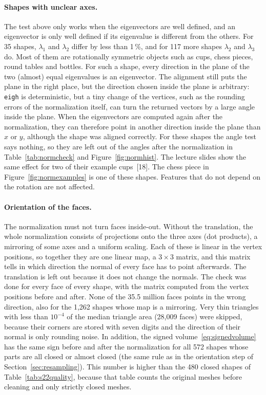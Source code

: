 \documentclass[10pt,a4paper]{article}
\begin{document}
\paragraph{Shapes with unclear axes.}
The test above only works when the eigenvectors are well defined, and an eigenvector is only well defined if its eigenvalue is
different from the others. For 35 shapes, $\lambda_1$ and $\lambda_2$ differ by less than 1\,\%, and for 117 more shapes
$\lambda_2$ and $\lambda_3$ do. Most of them are rotationally symmetric objects such as cups, chess pieces, round tables and
bottles. For such a shape, every direction in the plane of the two (almost) equal eigenvalues is an eigenvector. The
alignment still puts the plane in the right place, but the direction chosen inside the plane is arbitrary: \texttt{eigh} is
deterministic, but a tiny change of the vertices, such as the rounding errors of the normalization itself, can turn the
returned vectors by a large angle inside the plane. When the eigenvectors are computed again after the normalization, they can
therefore point in another direction inside the plane than $x$ or $y$, although the shape was aligned correctly. For these
shapes the angle test says nothing, so they are left out of the angles after the normalization in Table~\ref{tab:normcheck}
and Figure~\ref{fig:normhist}. The lecture slides show the same effect for two of their example cups~[18]. The chess piece in
Figure~\ref{fig:normexamples} is one of these shapes. Features that do not depend on the rotation are not affected.

\paragraph{Orientation of the faces.}
The normalization must not turn faces inside-out. Without the translation, the whole normalization consists of projections
onto the three axes (dot products), a mirroring of some axes and a uniform scaling. Each of these is linear in the vertex
positions, so together they are one linear map, a $3\times3$ matrix, and this matrix tells in which direction the normal of
every face has to point afterwards. The translation is left out because it does not change the normals. The
check was done for every face of every shape, with the matrix computed from the vertex positions before and after. None of the
35.5 million faces points in the wrong direction, also for the 1,262 shapes whose map is a mirroring. Very thin triangles with
less than $10^{-4}$ of the median triangle area (28,009 faces) were skipped, because their corners are stored with
seven digits and the direction of their normal is only rounding noise. In addition, the signed
volume~\eqref{eq:signedvolume} has the same sign before and after the normalization for all 572 shapes whose parts are all closed
or almost closed (the same rule as in the orientation step of Section~\ref{sec:resampling}). This number is higher than the 480
closed shapes of Table~\ref{tab:s22quality}, because that table counts the original meshes before cleaning and only strictly closed
meshes.
\end{document}
